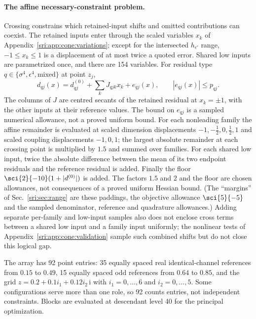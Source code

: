 \paragraph{The affine necessary-constraint problem.} Crossing constrains which retained-input shifts and omitted
contributions can coexist. The retained inputs enter through the scaled variables $x_k$ of
Appendix~\ref{sri:app:cone:variations}; except for the intersected $h_{\epsilon'}$ range, $-1\le x_k\le1$ is a displacement of
at most twice a quoted error. Shared low inputs are parametrized once, and there are 154 variables. For residual type
$q\in\{\sigma^4,\epsilon^4,\text{mixed}\}$ at point $z_j$,
\begin{equation}
 d_{qj}(x)=d^{(0)}_{qj}+\sum_kJ_{qjk}x_k+e_{qj}(x),\qquad |e_{qj}(x)|\le p_{qj}.
 \label{sri:eq:cone:affine}
\end{equation}
The columns of $J$ are centred secants of the retained residual at $x_k=\pm1$, with the other inputs at their
reference values. The bound on $e_{qj}$ is a sampled numerical allowance, not a proved uniform bound. For each
nonleading family the affine remainder is evaluated at scaled dimension displacements $-1,-\frac12,0,\frac12,1$ and
scaled coupling displacements $-1,0,1$; the largest absolute remainder at each crossing point is multiplied by $1.5$ and
summed over families. For each shared low input, twice the absolute difference between the mean of its two endpoint
residuals and the reference residual is added. Finally the floor $\sci{2}{-10}(1+|d^{(0)}|)$ is added. The factors
$1.5$ and $2$ and the floor are chosen allowances, not consequences of a proved uniform Hessian bound. (The ``margins''
of Sec.~\ref{sri:sec:range} are these paddings, the objective allowance $\sci{5}{-5}$ and the sampled denominator, reference
and quadrature allowances.) Adding separate
per-family and low-input samples also does not enclose cross terms between a shared low input and a family input
uniformly; the nonlinear tests of Appendix~\ref{sri:app:cone:validation} sample such combined shifts but do not close this
logical gap.

The array has 92 point entries: 35 equally spaced real identical-channel references from $0.15$ to $0.49$, 15 equally
spaced odd references from $0.64$ to $0.85$, and the grid $z=0.2+0.1i_1+0.12i_2\,\mathrm i$ with $i_1=0,\dots,6$ and
$i_2=0,\dots,5$. Some configurations serve more than one role, so 92 counts entries, not independent constraints.
Blocks are evaluated at descendant level 40 for the principal optimization.

